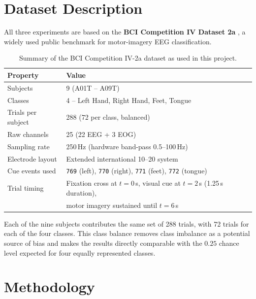 \documentclass[11pt,a4paper]{article}
\begin{document}
	\section{Dataset Description}
	\label{sec:dataset}
	
	All three experiments are based on the \textbf{BCI Competition IV Dataset 2a} \cite{brunner2008bci},
	a widely used public benchmark for motor-imagery EEG classification.
	
	\begin{table}[H]
		\centering
		\caption{Summary of the BCI Competition IV-2a dataset as used in this project.}
		\label{tab:dataset-summary}
		\begin{tabular}{ll}
			\toprule
			\textbf{Property} & \textbf{Value} \\
			\midrule
			Subjects & 9 (A01T -- A09T) \\
			Classes & 4 -- Left Hand, Right Hand, Feet, Tongue \\
			Trials per subject & 288 (72 per class, balanced) \\
			Raw channels & 25 (22 EEG + 3 EOG) \\
			Sampling rate & 250\,Hz (hardware band-pass 0.5--100\,Hz) \\
			Electrode layout & Extended international 10--20 system \\
			Cue events used & \texttt{769} (left), \texttt{770} (right), \texttt{771} (feet), \texttt{772} (tongue) \\
			Trial timing & Fixation cross at $t{=}0$\,s, visual cue at $t{=}2$\,s (1.25\,s duration), \\
			& motor imagery sustained until $t{=}6$\,s \\
			\bottomrule
		\end{tabular}
	\end{table}
	
	Each of the nine subjects contributes the same set of 288 trials, with 72 trials for each of the
	four classes. This class balance removes class imbalance as a potential source of bias and makes
	the results directly comparable with the $0.25$ chance level expected for four equally represented
	classes.
	
	\section{Methodology}
	\label{sec:methodology}
	
\end{document}
